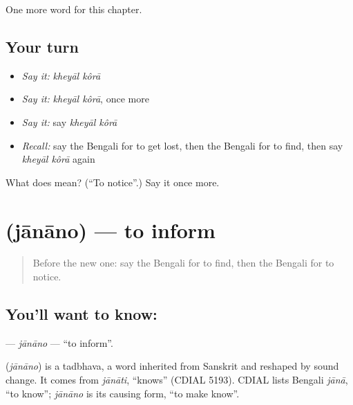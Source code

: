 \begin{grammarlens}[title={What you've built}]
One more word for this chapter.
\end{grammarlens}

\subsection*{Your turn}
\begin{itemize}
\raggedright
  \item \emph{Say it:} \emph{kheyāl kôrā}
  \item \emph{Say it:} \emph{kheyāl kôrā}, once more
  \item \emph{Say it:} say \emph{kheyāl kôrā}
  \item \emph{Recall:} say the Bengali for to get lost, then the Bengali for to find, then say \emph{kheyāl kôrā} again
\end{itemize}

\begin{tcolorbox}[breakable,colback=teal!4,colframe=teal!35!black,title={Before you move on}]
What does   mean? (\textquotedblleft{}To notice\textquotedblright{}.) Say it once more.
\end{tcolorbox}
\section[\texorpdfstring{\bn{জানানো} (jānāno)}{জানানো (jānāno)}]{ (jānāno) — to inform}

\label{lesson:BN-C241-janano}



\begin{quote}
Before the new one: say the Bengali for to find, then the Bengali for to notice.
\end{quote}

\subsection*{You'll want to know: }
\textbf{} — \emph{jānāno} — \textquotedblleft{}to inform\textquotedblright{}.

\begin{cousinweb}
\textbf{} (\emph{jānāno}) is a tadbhava, a word inherited from Sanskrit and reshaped by sound change. It comes from \emph{jānāti}, \textquotedblleft{}knows\textquotedblright{} (CDIAL 5193). CDIAL lists Bengali \emph{jānā}, \textquotedblleft{}to know\textquotedblright{}; \emph{jānāno} is its causing form, \textquotedblleft{}to make know\textquotedblright{}.
\end{cousinweb}

